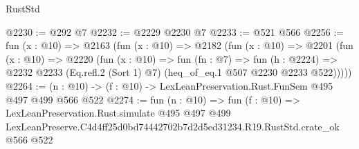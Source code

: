 \begin{lexlean}{RustStd}
\begin{coremodule}
@2230 := @292 @7
@2232 := @2229 @2230 @7
@2233 := @521 @566
@2256 := fun (x : @10) =>
  @2163
    (fun (x : @10) =>
    @2182
      (fun (x : @10) =>
      @2201
        (fun (x : @10) =>
        @2220
          (fun (x : @10) =>
          fun (fn : @7) =>
          fun (h : @2224) =>
          @2232 @2233 (Eq.refl.{2} (Sort 1) @7) (heq_of_eq.{1} @507 @2230 @2233 @522)))))
@2264 := (n : @10) -> (f : @10) -> LexLeanPreservation.Rust.FunSem @495 @497 @499 @566 @522
@2274 := fun (n : @10) =>
  fun (f : @10) =>
  LexLeanPreservation.Rust.simulate
    @495
    @497
    @499
    LexLeanPreserve.C4d4ff25d0bd74442702b7d2d5ed31234.R19.RustStd.crate_ok
    @566
    @522
\end{coremodule}
\end{lexlean}
